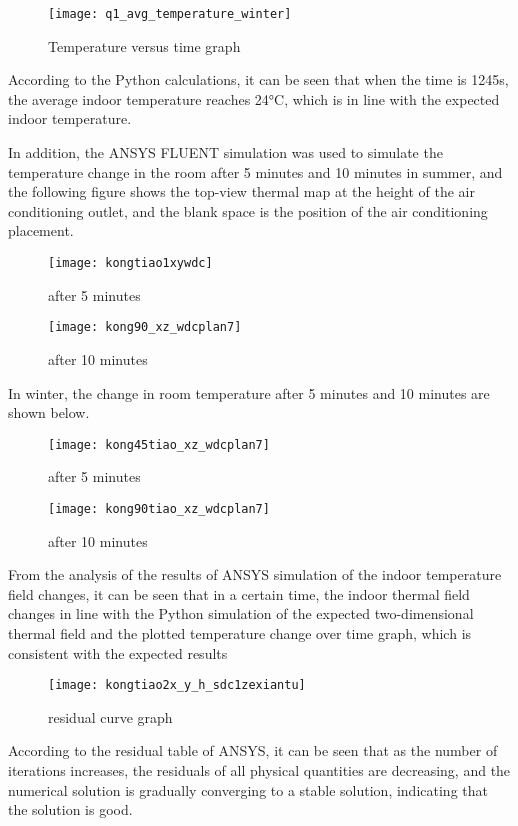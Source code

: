 \documentclass{apmcmthesis}
\begin{document}
\begin{figure}[H]
	\centering
	\texttt{[image: q1\_avg\_temperature\_winter]}%
	\caption{Temperature versus time graph} %
\end{figure}
According to the Python calculations, it can be seen that when the time is 1245s, the average indoor temperature reaches 24°C, which is in line with the expected indoor temperature.

In addition, the ANSYS FLUENT \cite{zhu2002concentration}simulation was used to simulate the temperature change in the room after 5 minutes and 10 minutes in summer, and the following figure shows the top-view thermal map at the height of the air conditioning outlet, and the blank space is the position of the air conditioning placement.


\begin{figure}[H]
	\centering
	\begin{minipage}{0.5\textwidth}
		\centering
		\texttt{[image: kongtiao1xywdc]}
		\caption{after 5 minutes}
	\end{minipage}%
	\begin{minipage}{0.5\textwidth}
		\centering
		\texttt{[image: kong90\_xz\_wdcplan7]}
		\caption{after 10 minutes}
	\end{minipage}
\end{figure}


In winter, the change in room temperature after 5 minutes and 10 minutes are shown below.

\begin{figure}[H]
	\centering
	\begin{minipage}{0.5\textwidth}
		\centering
		\texttt{[image: kong45tiao\_xz\_wdcplan7]}
		\caption{after 5 minutes}
	\end{minipage}%
	\begin{minipage}{0.5\textwidth}
		\centering
		\texttt{[image: kong90tiao\_xz\_wdcplan7]}
		\caption{after 10 minutes}
	\end{minipage}
\end{figure}


From the analysis of the results of ANSYS simulation of the indoor temperature field changes, it can be seen that in a certain time, the indoor thermal field changes in line with the Python simulation of the expected two-dimensional thermal field and the plotted temperature change over time graph, which is consistent with the expected results
\begin{figure}[H]
	\centering
	\texttt{[image: kongtiao2x\_y\_h\_sdc1zexiantu]}%
	\caption{residual curve graph} %
\end{figure}
According to the residual table of ANSYS, it can be seen that as the number of iterations increases, the residuals of all physical quantities are decreasing, and the numerical solution is gradually converging to a stable solution, indicating that the solution is good. 
\end{document}
